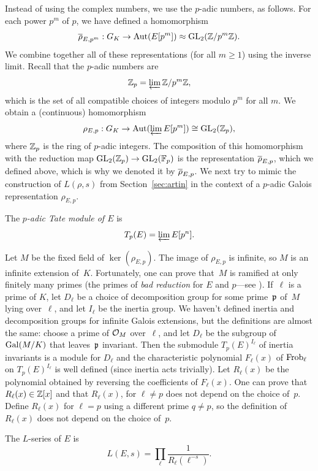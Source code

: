 Instead of using the complex numbers, we use the $p$-adic numbers, as
follows.  For each power $p^m$ of $p$, we have defined a homomorphism
$$
  \overline{\rho}_{E,p^m}: G_K \to \operatorname{Aut}(E[p^m]) \approx \operatorname{GL}_2(\mathbb{Z}/p^m\mathbb{Z}).
$$
We combine together all of these representations (for all $m\geq 1$)
using the inverse limit.
Recall that the $p$-adic numbers are
$$
  \mathbb{Z}_p = \varprojlim \mathbb{Z}/p^m\mathbb{Z},
$$
which is the set of all compatible choices of integers modulo $p^m$ for
all $m$.
We obtain a (continuous) homomorphism
$$
  \rho_{E,p}: G_K \to \operatorname{Aut}(\varprojlim E[p^m]) \cong \operatorname{GL}_2(\mathbb{Z}_p),
$$
where $\mathbb{Z}_p$ is the ring of $p$-adic integers.  The composition of
this homomorphism with the reduction map $\operatorname{GL}_2(\mathbb{Z}_p) \to \operatorname{GL}_2(\mathbb{F}_p)$
is the representation $\overline{\rho}_{E,p}$, which we defined above, which
is why we denoted it by $\overline{\rho}_{E,p}$. We
next try to mimic the construction of $L(\rho,s)$ from
Section~\ref{sec:artin} in the context of a $p$-adic Galois
representation $\rho_{E,p}$.

\begin{definition}
The \emph{$p$-adic Tate module of $E$} is
$$
  T_p(E) = \varprojlim E[p^n].
$$
\end{definition}

Let $M$ be the fixed field of $\ker(\rho_{E,p})$. The image of
$\rho_{E,p}$ is infinite, so $M$ is an infinite extension of~$K$.
Fortunately, one can prove that~$M$ is ramified at only finitely many
primes (the primes of \emph{bad reduction} for $E$ and $p$---see
\cite{serre-tate}).
If~$\ell$ is a prime of $K$, let $D_{\ell}$ be a choice of
decomposition group for
some prime~$\mathfrak{p}$ of~$M$ lying over~$\ell$, and let $I_{\ell}$ be the
inertia group.  We haven't defined inertia and decomposition groups
for infinite Galois extensions, but the definitions are almost the
same: choose a prime of $\mathcal{O}_M$ over~$\ell$, and let $D_{\ell}$ be the
subgroup of $\operatorname{Gal}(M/K)$ that leaves~$\mathfrak{p}$ invariant.  Then the
submodule $T_p(E)^{I_{\ell}}$ of inertia invariants is a module for
$D_{\ell}$ and the characteristic polynomial $F_{\ell}(x)$ of
$\operatorname{Frob}_{\ell}$ on $T_p(E)^{I_{\ell}}$ is well defined (since inertia
acts trivially).  Let $R_{\ell}(x)$ be the polynomial obtained by
reversing the coefficients of $F_{\ell}(x)$.  One can prove that
$R_{\ell}(x) \in \mathbb{Z}[x]$ and that $R_{\ell}(x)$, for $\ell\neq p$ does
not depend on the choice of~$p$.  Define $R_{\ell}(x)$ for $\ell=p$
using a different prime $q\neq p$, so the definition of $R_{\ell}(x)$
does not depend on the choice of~$p$.
\begin{definition}
The $L$-series of $E$ is
$$
 L(E,s) = \prod_{\ell} \frac{1}{R_\ell(\ell^{-s})}.
$$
\end{definition}

